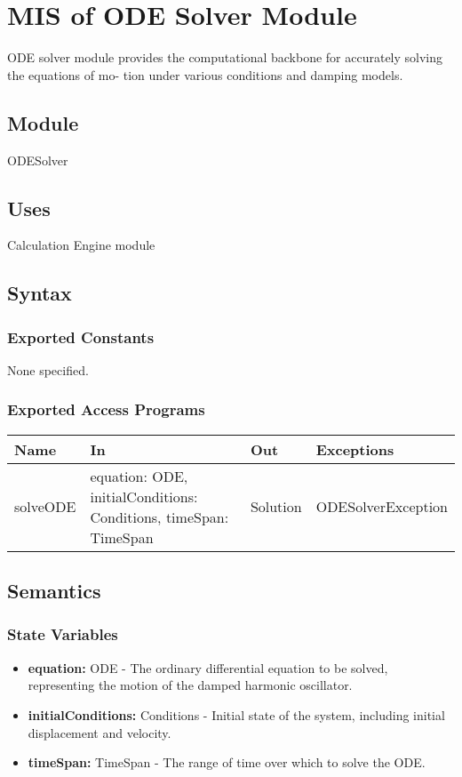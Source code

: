 \documentclass[12pt, titlepage]{article}
\begin{document}

\section{MIS of ODE Solver Module} \label{mPVM}

ODE solver module provides the computational backbone for accurately solving the equations of mo-
tion under various conditions and damping models.

\subsection{Module}
ODESolver

\subsection{Uses}
Calculation Engine module

\subsection{Syntax}

\subsubsection{Exported Constants}
None specified.

\subsubsection{Exported Access Programs}

\begin{center}
\begin{tabular}{p{2cm} p{5cm} p{2cm} p{5cm}}
\hline
\textbf{Name} & \textbf{In} & \textbf{Out} & \textbf{Exceptions} \\
\hline
solveODE & equation: ODE, initialConditions: Conditions, timeSpan: TimeSpan & Solution & ODESolverException \\
\hline
\end{tabular}
\end{center}

\subsection{Semantics}

\subsubsection{State Variables}
\begin{itemize}
  \item \textbf{equation:} ODE - The ordinary differential equation to be solved, representing the motion of the damped harmonic oscillator.
  \item \textbf{initialConditions:} Conditions - Initial state of the system, including initial displacement and velocity.
  \item \textbf{timeSpan:} TimeSpan - The range of time over which to solve the ODE.
\end{itemize}
\end{document}
